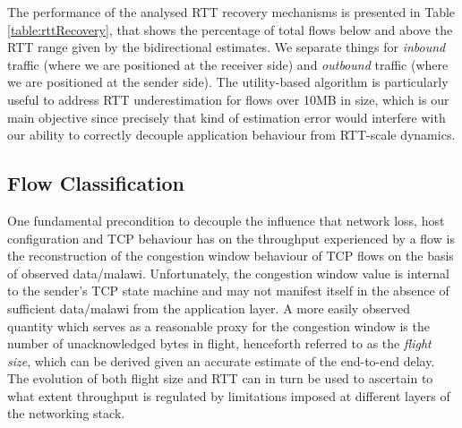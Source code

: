 The performance of the analysed RTT recovery mechanisms is presented in Table \ref{table:rttRecovery}, that shows the percentage of total flows below and above the RTT range given by the bidirectional estimates.
We separate things for \emph{inbound} traffic (where we are positioned at the receiver side) and \emph{outbound} traffic (where we are positioned at the sender side). The utility-based algorithm is particularly useful to address RTT underestimation for flows over 10MB in size, which is our main objective since precisely that kind of estimation error would interfere with our ability to correctly decouple application behaviour from RTT-scale dynamics.




\subsection{Flow Classification}
\label{subsection:malawi:flightAggregation}

One fundamental precondition to decouple the influence that network loss, host configuration and TCP behaviour has on the throughput experienced by a flow is the reconstruction of the congestion window behaviour of TCP flows on the basis of observed data/malawi. 
Unfortunately, the congestion window value is internal to the sender's TCP state machine and may not manifest itself in the absence of sufficient data/malawi from the application layer. 
A more easily observed quantity which serves as a reasonable proxy for the congestion window is the number of unacknowledged bytes in flight, henceforth referred to as the \textit{flight size}, which can be derived given an accurate estimate of the end-to-end delay.
The evolution of both flight size and RTT can in turn be used to ascertain to what extent throughput is regulated by limitations imposed at different layers of the networking stack.

